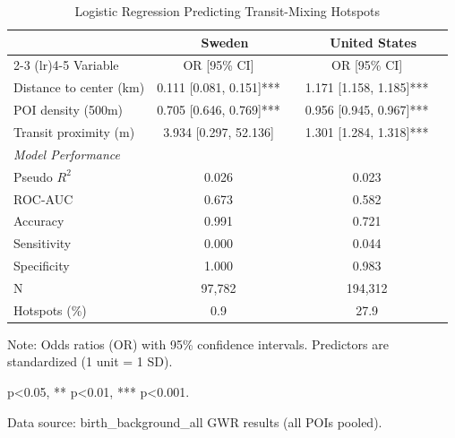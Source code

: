 \begin{table}[htbp]
\centering
\caption{Logistic Regression Predicting Transit-Mixing Hotspots}
\label{tab:logit_hotspot}
\small
\begin{tabular}{lcccc}
\toprule
 & \multicolumn{2}{c}{Sweden} & \multicolumn{2}{c}{United States} \\
\cmidrule(lr){2-3} \cmidrule(lr){4-5}
Variable & OR [95\% CI] & & OR [95\% CI] & \\
\midrule
\quad Distance to center (km) & 0.111 [0.081, 0.151]*** & & 1.171 [1.158, 1.185]*** & \\
\quad POI density (500m) & 0.705 [0.646, 0.769]*** & & 0.956 [0.945, 0.967]*** & \\
\quad Transit proximity (m) & 3.934 [0.297, 52.136] & & 1.301 [1.284, 1.318]*** & \\
\addlinespace[3pt]
\textit{Model Performance} & & & & \\
\quad Pseudo $R^2$ & 0.026 & & 0.023 & \\
\quad ROC-AUC & 0.673 & & 0.582 & \\
\quad Accuracy & 0.991 & & 0.721 & \\
\quad Sensitivity & 0.000 & & 0.044 & \\
\quad Specificity & 1.000 & & 0.983 & \\
\addlinespace[3pt]
\quad N & 97,782 & & 194,312 & \\
\quad Hotspots (\%) & 0.9 & & 27.9 & \\
\bottomrule
\end{tabular}
\begin{tablenotes}
\small
\item Note: Odds ratios (OR) with 95\% confidence intervals. Predictors are standardized (1 unit = 1 SD).
\item * p<0.05, ** p<0.01, *** p<0.001.
\item Data source: birth\_background\_all GWR results (all POIs pooled).
\end{tablenotes}
\end{table}